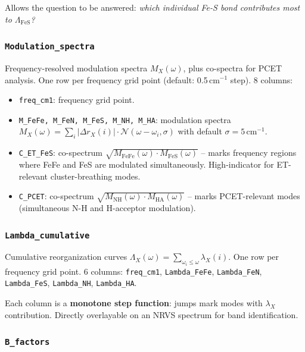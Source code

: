 \documentclass[11pt,a4paper,twoside]{article}
\theoremstyle{remark}
\begin{document}
Allows the question to be answered: \emph{which individual Fe-S
bond contributes most to $\Lambda_\text{FeS}$?}

\subsubsection*{\texttt{Modulation\_spectra}}

Frequency-resolved modulation spectra $M_X(\omega)$, plus
co-spectra for PCET analysis. One row per frequency grid point
(default: 0.5\,cm$^{-1}$ step). 8 columns:

\begin{itemize}\setlength{\itemsep}{0pt}
  \item \texttt{freq\_cm1}: frequency grid point.
  \item \texttt{M\_FeFe, M\_FeN, M\_FeS, M\_NH, M\_HA}:
        modulation spectra
        $M_X(\omega) = \sum_i |\Delta r_X(i)| \cdot
        \mathcal{N}(\omega - \omega_i, \sigma)$ with default
        $\sigma=5$\,cm$^{-1}$.
  \item \texttt{C\_ET\_FeS}: co-spectrum
        $\sqrt{M_\text{FeFe}(\omega) \cdot M_\text{FeS}(\omega)}$
        -- marks frequency regions where FeFe and FeS are
        modulated simultaneously. High-indicator for
        ET-relevant cluster-breathing modes.
  \item \texttt{C\_PCET}: co-spectrum
        $\sqrt{M_\text{NH}(\omega) \cdot M_\text{HA}(\omega)}$
        -- marks PCET-relevant modes (simultaneous N-H and
        H-acceptor modulation).
\end{itemize}

\subsubsection*{\texttt{Lambda\_cumulative}}

Cumulative reorganization curves $\Lambda_X(\omega) = \sum_{\omega_i \leq \omega}
\lambda_X(i)$. One row per frequency grid point. 6 columns:
\texttt{freq\_cm1}, \texttt{Lambda\_FeFe}, \texttt{Lambda\_FeN},
\texttt{Lambda\_FeS}, \texttt{Lambda\_NH}, \texttt{Lambda\_HA}.

Each column is a \textbf{monotone step function}: jumps mark
modes with $\lambda_X$ contribution. Directly overlayable on an
NRVS spectrum for band identification.

\subsubsection*{\texttt{B\_factors}}
\end{document}
